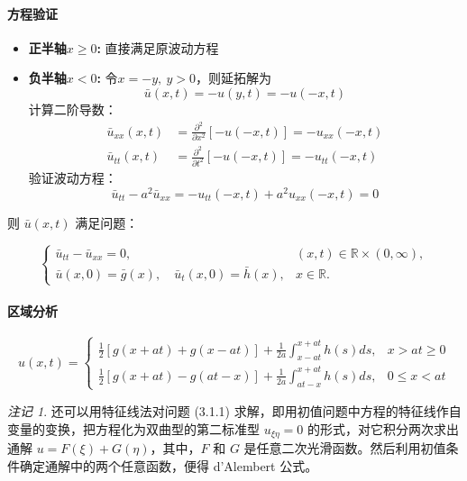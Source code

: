 \documentclass[12pt,a4paper]{article}
\numberwithin{subsection}{section}   %
\numberwithin{subsubsection}{subsection}
\theoremstyle{plain}
\theoremstyle{definition}
\theoremstyle{remark}
\newtheorem{remark}[theorem]{注记}
\theoremstyle{remark}
\begin{document}
\paragraph{方程验证}
\begin{itemize}
	\item \textbf{正半轴$x \geq 0$:} 直接满足原波动方程
	
	\item \textbf{负半轴$x < 0$:} 令$x = -y,\ y > 0$，则延拓解为
	\[
	\bar{u}(x,t) = -u(y,t) = -u(-x,t)
	\]
	计算二阶导数：
	\begin{align}
		\bar{u}_{xx}(x,t) &= \frac{\partial^2}{\partial x^2}[-u(-x,t)] = -u_{xx}(-x,t) \\
		\bar{u}_{tt}(x,t) &= \frac{\partial^2}{\partial t^2}[-u(-x,t)] = -u_{tt}(-x,t)
	\end{align}
	验证波动方程：
	\[
	\bar{u}_{tt} - a^2\bar{u}_{xx} = -u_{tt}(-x,t) + a^2u_{xx}(-x,t) = 0 
	\]
\end{itemize}






	则 \(\bar{u}(x, t)\) 满足问题：
	
	\begin{equation}
		\begin{cases}
			\bar{u}_{tt} - \bar{u}_{xx} = 0, & (x, t) \in \mathbb{R} \times (0, \infty), \\[8pt]
			\bar{u}(x, 0) = \bar{g}(x), \quad \bar{u}_t(x, 0) = \bar{h}(x), & x \in \mathbb{R}.
		\end{cases}
	\end{equation}




\paragraph{区域分析}
	\begin{equation}
		u(x,t) = 
		\begin{cases}
			\displaystyle
			\frac{1}{2}\left[g(x+at) + g(x-at)\right] + \frac{1}{2a}\int_{x-at}^{x+at} h(s) ds, & x > at \geq 0 \\
			\displaystyle
			\frac{1}{2}\left[g(x+at) - g(at-x)\right] + \frac{1}{2a}\int_{at-x}^{x+at} h(s) ds, & 0 \leq x < at
		\end{cases}
	\end{equation}
	
	
	\begin{remark}
		还可以用特征线法对问题 (3.1.1) 求解，即用初值问题中方程的特征线作自变量的变换，把方程化为双曲型的第二标准型 \(u_{\xi\eta} = 0\) 的形式，对它积分两次求出通解 \(u = F(\xi) + G(\eta)\)，其中，\(F\) 和 \(G\) 是任意二次光滑函数。然后利用初值条件确定通解中的两个任意函数，便得 d'Alembert 公式。
	\end{remark}
	
\end{document}
